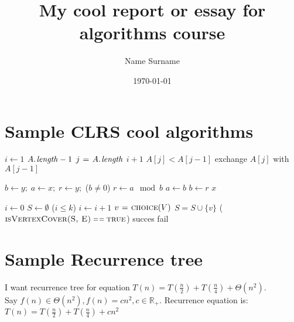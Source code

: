 \documentclass[12pt,a4paper]{article}
\title{My cool report or essay for algorithms course}\let\Title\@title
\author{Name Surname}\let\Author\@author
\date{\today}           \let\Date\@date
\numberwithin{equation}{section}  %
\begin{document}
  \maketitle
 \newpage
 \tableofcontents
  \newpage
  
  \section{Sample CLRS cool algorithms}
  
  \begin{codebox}
  \li \For $i \gets 1$ \To $\attrib{A}{length} - 1$
  \Do
      \li \For $j \gets \attrib{A}{length}$ \Downto $i + 1$
      \Do
	  \li \If $A[j] < A[j - 1]$ 
	   \Do
	   \li   exchange $A[j]$ with $A[j - 1]$
	    \End
	\End
   \End
\end{codebox}

\begin{codebox}
  \li $b \gets y; \; a \gets x; \; r \gets y; $
  \li \While ($b \neq 0$)
      \Do
	  \li $r \gets a \mod b$
	   \li $a \gets b$
	   \li $b \gets r$
      \End
  \li \Return $x$
\end{codebox}

\begin{codebox}
  \li $i \gets 0$ \li $S \gets \emptyset$
  \li \While($i \le k$) \Do
  \li $i \gets i + 1$
  \li $v \mathrel{\hspace{1pt}=\hspace{1pt}} \textnormal{\scshape choice}(V)$
  \li $S = S \cup \{v\}$
  \End
  \li 
\If ($\proc{isVertexCover(S, E)} \isequal \const{true}$)
\li
\Then
\Return succes
\li
\Else
\Return fail
\End
\end{codebox}
  
 \section{Sample Recurrence tree}
 
I want recurrence tree for equation $T(n) = T \left( \frac{n}{2} \right) + T \left(   \frac{n}{4} \right) + \Theta(n^2)$. \\

Say $f(n) \in \Theta (n^2), f(n) = cn^2, c \in \mathbb{R}_+$. Recurrence equation is: $T(n) = T \left(   \frac{n}{2} \right) + T \left(   \frac{n}{4} \right) + cn^2$
\end{document}
